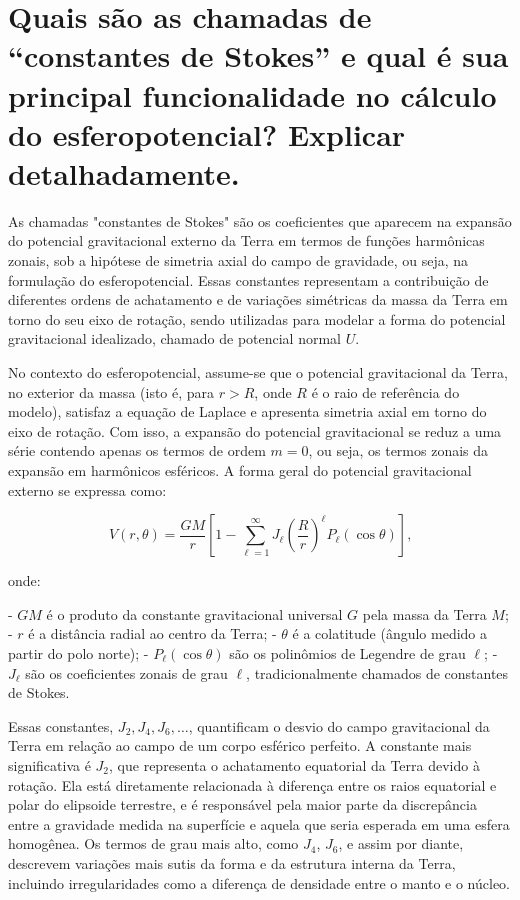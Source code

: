 \section{Quais são as chamadas de “constantes de Stokes” e qual é sua principal funcionalidade no cálculo do esferopotencial? Explicar detalhadamente.}

As chamadas "constantes de Stokes" são os coeficientes que aparecem na expansão do potencial gravitacional externo da Terra em termos de funções harmônicas zonais, sob a hipótese de simetria axial do campo de gravidade, ou seja, na formulação do esferopotencial. Essas constantes representam a contribuição de diferentes ordens de achatamento e de variações simétricas da massa da Terra em torno do seu eixo de rotação, sendo utilizadas para modelar a forma do potencial gravitacional idealizado, chamado de potencial normal \( U \).

No contexto do esferopotencial, assume-se que o potencial gravitacional da Terra, no exterior da massa (isto é, para \( r > R \), onde \( R \) é o raio de referência do modelo), satisfaz a equação de Laplace e apresenta simetria axial em torno do eixo de rotação. Com isso, a expansão do potencial gravitacional se reduz a uma série contendo apenas os termos de ordem \( m = 0 \), ou seja, os termos zonais da expansão em harmônicos esféricos. A forma geral do potencial gravitacional externo se expressa como:

\[
V(r, \theta) = \frac{GM}{r} \left[ 1 - \sum_{\ell=1}^\infty J_\ell \left( \frac{R}{r} \right)^\ell P_\ell(\cos \theta) \right] \text{,}
\]

onde:

- \( GM \) é o produto da constante gravitacional universal \( G \) pela massa da Terra \( M \);
- \( r \) é a distância radial ao centro da Terra;
- \( \theta \) é a colatitude (ângulo medido a partir do polo norte);
- \( P_\ell(\cos \theta) \) são os polinômios de Legendre de grau \( \ell \);
- \( J_\ell \) são os coeficientes zonais de grau \( \ell \), tradicionalmente chamados de constantes de Stokes.

Essas constantes, \( J_2, J_4, J_6, \ldots \), quantificam o desvio do campo gravitacional da Terra em relação ao campo de um corpo esférico perfeito. A constante mais significativa é \( J_2 \), que representa o achatamento equatorial da Terra devido à rotação. Ela está diretamente relacionada à diferença entre os raios equatorial e polar do elipsoide terrestre, e é responsável pela maior parte da discrepância entre a gravidade medida na superfície e aquela que seria esperada em uma esfera homogênea. Os termos de grau mais alto, como \( J_4 \), \( J_6 \), e assim por diante, descrevem variações mais sutis da forma e da estrutura interna da Terra, incluindo irregularidades como a diferença de densidade entre o manto e o núcleo.

